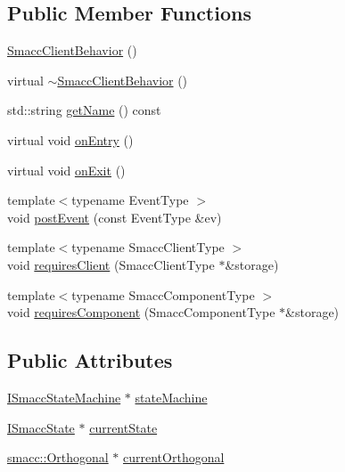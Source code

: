 \subsection*{Public Member Functions}
\begin{DoxyCompactItemize}
\item 
\hyperlink{classsmacc_1_1SmaccClientBehavior_a5fbea298db572d6c7558bfd1a65a942b}{Smacc\+Client\+Behavior} ()
\item 
virtual \hyperlink{classsmacc_1_1SmaccClientBehavior_a93dbf03b9c76a580c2de47d5bef7de0f}{$\sim$\+Smacc\+Client\+Behavior} ()
\item 
std\+::string \hyperlink{classsmacc_1_1SmaccClientBehavior_a3bdd13bc7822f75bdb64a1f23bcf9d6c}{get\+Name} () const 
\item 
virtual void \hyperlink{classsmacc_1_1SmaccClientBehavior_a7962382f93987c720ad432fef55b123f}{on\+Entry} ()
\item 
virtual void \hyperlink{classsmacc_1_1SmaccClientBehavior_ac0cd72d42bd00425362a97c9803ecce5}{on\+Exit} ()
\item 
{\footnotesize template$<$typename Event\+Type $>$ }\\void \hyperlink{classsmacc_1_1SmaccClientBehavior_ab29b23145ea074ad69340fc0af6fbb75}{post\+Event} (const Event\+Type \&ev)
\item 
{\footnotesize template$<$typename Smacc\+Client\+Type $>$ }\\void \hyperlink{classsmacc_1_1SmaccClientBehavior_a917f001e763a1059af337bf4e164f542}{requires\+Client} (Smacc\+Client\+Type $\ast$\&storage)
\item 
{\footnotesize template$<$typename Smacc\+Component\+Type $>$ }\\void \hyperlink{classsmacc_1_1SmaccClientBehavior_adee6abe3a28aa6b47d3dd5267e264b4d}{requires\+Component} (Smacc\+Component\+Type $\ast$\&storage)
\end{DoxyCompactItemize}
\subsection*{Public Attributes}
\begin{DoxyCompactItemize}
\item 
\hyperlink{classsmacc_1_1ISmaccStateMachine}{I\+Smacc\+State\+Machine} $\ast$ \hyperlink{classsmacc_1_1SmaccClientBehavior_aa1c28c177d50a471c88c6a577cd6077e}{state\+Machine}
\item 
\hyperlink{classsmacc_1_1ISmaccState}{I\+Smacc\+State} $\ast$ \hyperlink{classsmacc_1_1SmaccClientBehavior_af76fc9b877542ed5caf033f820c107d0}{current\+State}
\item 
\hyperlink{classsmacc_1_1Orthogonal}{smacc\+::\+Orthogonal} $\ast$ \hyperlink{classsmacc_1_1SmaccClientBehavior_a642742da14ffa20e323a03eefecfc8b2}{current\+Orthogonal}
\end{DoxyCompactItemize}
